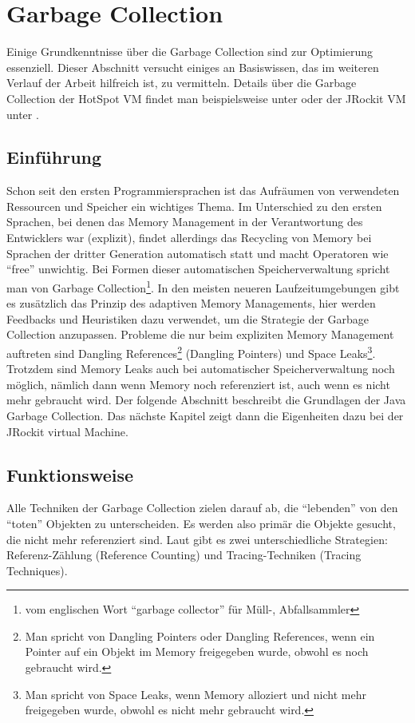 \chapter{Garbage Collection}\label{grundlagen_gc}
Einige Grundkenntnisse über die Garbage Collection sind zur Optimierung essenziell. Dieser Abschnitt versucht einiges an Basiswissen, das im weiteren Verlauf der Arbeit hilfreich ist, zu vermitteln. Details über die Garbage Collection der HotSpot VM findet man beispielsweise unter \cite{langerkreftJavaCore} oder der JRockit VM unter \cite{lagergren2010oracle}.

\section{Einführung}
Schon seit den ersten Programmiersprachen ist das Aufräumen von verwendeten Ressourcen und Speicher ein wichtiges Thema. Im Unterschied zu den ersten Sprachen, bei denen das Memory Management in der Verantwortung des Entwicklers war (explizit), findet allerdings das Recycling von Memory bei Sprachen der dritter Generation automatisch statt und macht Operatoren wie ``free'' unwichtig. Bei Formen dieser automatischen Speicherverwaltung spricht man von Garbage Collection\footnote{vom englischen Wort ``garbage collector'' für Müll-, Abfallsammler}. In den meisten neueren Laufzeitumgebungen gibt es zusätzlich das Prinzip  des adaptiven Memory Managements, hier werden Feedbacks und Heuristiken dazu verwendet, um die Strategie der Garbage Collection anzupassen.
Probleme die nur beim expliziten Memory Management auftreten sind  Dangling References\footnote{Man spricht von Dangling Pointers oder Dangling References, wenn ein Pointer auf ein Objekt im Memory freigegeben wurde, obwohl es noch gebraucht wird.} (Dangling Pointers) und Space Leaks\footnote{Man spricht von Space Leaks, wenn Memory alloziert und nicht mehr freigegeben wurde, obwohl es nicht mehr gebraucht wird.\cite{sunMemoryManagementWP}}. Trotzdem sind Memory Leaks auch bei automatischer Speicherverwaltung noch möglich, nämlich dann wenn Memory noch referenziert ist, auch wenn es nicht mehr gebraucht wird.
Der folgende Abschnitt beschreibt die Grundlagen der Java Garbage Collection. Das nächste Kapitel zeigt dann die Eigenheiten dazu bei der JRockit virtual Machine.

\section{Funktionsweise}
Alle Techniken der Garbage Collection zielen darauf ab, die ``lebenden'' von den ``toten'' Objekten zu unterscheiden. Es werden also primär die Objekte gesucht, die nicht mehr referenziert sind. Laut \cite[S. 77]{lagergren2010oracle} gibt es zwei unterschiedliche Strategien: Referenz-Zählung (Reference Counting) und Tracing-Techniken (Tracing Techniques).

